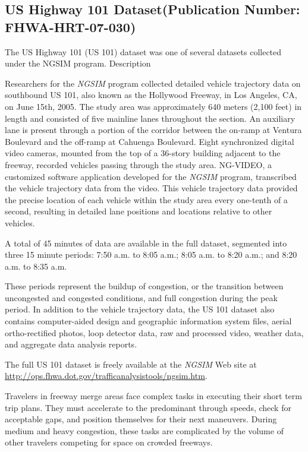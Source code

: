 \subsection{US Highway 101 Dataset(Publication Number: FHWA-HRT-07-030)}

The US Highway 101 (US 101) dataset was one of several datasets collected under the NGSIM program.
Description

Researchers for the {\it NGSIM} program collected detailed vehicle trajectory data on southbound US 101, also known as the Hollywood Freeway, in Los Angeles, CA, on June 15th, 2005. The study area was approximately 640 meters (2,100 feet) in length and consisted of five mainline lanes throughout the section. An auxiliary lane is present through a portion of the corridor between the on-ramp at Ventura Boulevard and the off-ramp at Cahuenga Boulevard. Eight synchronized digital video cameras, mounted from the top of a 36-story building adjacent to the freeway, recorded vehicles passing through the study area. NG-VIDEO, a customized software application developed for the {\it NGSIM} program, transcribed the vehicle trajectory data from the video. This vehicle trajectory data provided the precise location of each vehicle within the study area every one-tenth of a second, resulting in detailed lane positions and locations relative to other vehicles.

A total of 45 minutes of data are available in the full dataset, segmented into three 15 minute periods: 7:50 a.m. to 8:05 a.m.; 8:05 a.m. to 8:20 a.m.; and 8:20 a.m. to 8:35 a.m.

These periods represent the buildup of congestion, or the transition between uncongested and congested conditions, and full congestion during the peak period. In addition to the vehicle trajectory data, the US 101 dataset also contains computer-aided design and geographic information system files, aerial ortho-rectified photos, loop detector data, raw and processed video, weather data, and aggregate data analysis reports.

The full US 101 dataset is freely available at the {\it NGSIM} Web site at \url{http://ops.fhwa.dot.gov/trafficanalysistools/ngsim.htm}.

Travelers in freeway merge areas face complex tasks in executing their short term trip plans. They must accelerate to the predominant through speeds, check for acceptable gaps, and position themselves for their next maneuvers. During medium and heavy congestion, these tasks are complicated by the volume of other travelers competing for space on crowded freeways.

